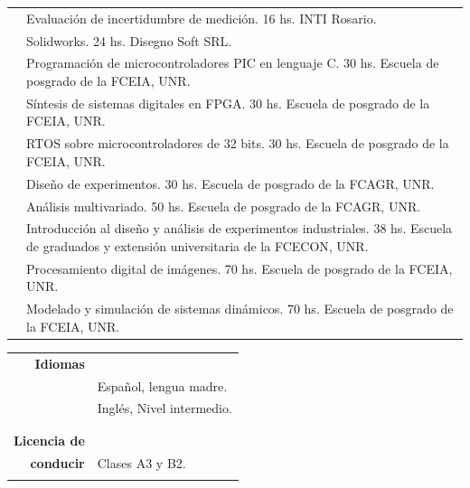 \documentclass[a4paper,10pt, sans]{article}
\begin{document}
\begin{table}[H]
\begin{tabularx}{\textwidth}{r X}
      {} & Evaluación de incertidumbre de medición. 16 hs. INTI Rosario. \\ 
      {} & Solidworks. 24 hs. Disegno Soft SRL. \\ 
      {} & Programación de microcontroladores PIC en lenguaje C. 30 hs. Escuela de posgrado de la FCEIA, UNR. \\
      {} & Síntesis de sistemas digitales en FPGA. 30 hs. Escuela de posgrado de la FCEIA, UNR. \\
      {} & RTOS sobre microcontroladores de 32 bits. 30 hs. Escuela de posgrado de la FCEIA, UNR. \\
      {} & Diseño de experimentos. 30 hs. Escuela de posgrado de la FCAGR, UNR. \\
      {} & Análisis multivariado. 50 hs. Escuela de posgrado de la FCAGR, UNR. \\
      {} & Introducción al diseño y análisis de experimentos industriales. 38 hs. Escuela de graduados y extensión universitaria de la FCECON, UNR. \\
      {} & Procesamiento digital de imágenes. 70 hs. Escuela de posgrado de la FCEIA, UNR. \\
      {} & Modelado y simulación de sistemas dinámicos. 70 hs. Escuela de posgrado de la FCEIA, UNR. \\ 
    
  \end{tabularx}
  \end{table}



  
  \begin{table}[H]
  \centering
  \begin{tabularx}{\textwidth}{r X}  
      
    \textbf{Idiomas} & {} \\ [1ex]
    {} & Español, lengua madre. \\ [1ex]
    {} & Inglés, Nivel intermedio. \\ \\ \hline \\
      
    \textbf{Licencia de} & {} \\ [1ex]
    \textbf{conducir} & Clases A3 y B2.\\
    
\vspace{5cm}
    
    
    
    
        
  \end{tabularx}
  \end{table}
  
\end{document}
